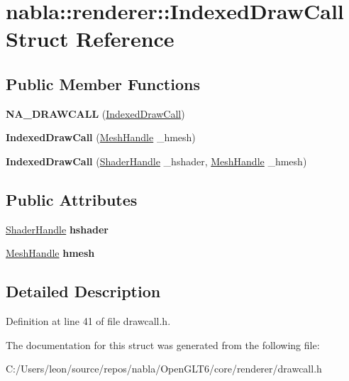 \hypertarget{structnabla_1_1renderer_1_1_indexed_draw_call}{}\section{nabla\+::renderer\+::Indexed\+Draw\+Call Struct Reference}
\label{structnabla_1_1renderer_1_1_indexed_draw_call}
\subsection*{Public Member Functions}
\begin{DoxyCompactItemize}
\item 
\mbox{\label{structnabla_1_1renderer_1_1_indexed_draw_call_ade4d7a08636b7d2f149462ad15a9c431}} 
{\bfseries N\+A\+\_\+\+D\+R\+A\+W\+C\+A\+LL} (\mbox{\hyperlink{structnabla_1_1renderer_1_1_indexed_draw_call}{Indexed\+Draw\+Call}})
\item 
\mbox{\label{structnabla_1_1renderer_1_1_indexed_draw_call_a0341b6c14a88717421dfa1f720618705}} 
{\bfseries Indexed\+Draw\+Call} (\mbox{\hyperlink{classnabla_1_1renderer_1_1_handle}{Mesh\+Handle}} \+\_\+hmesh)
\item 
\mbox{\label{structnabla_1_1renderer_1_1_indexed_draw_call_af9299df4bc3cac5cba953a8a7a20f912}} 
{\bfseries Indexed\+Draw\+Call} (\mbox{\hyperlink{classnabla_1_1renderer_1_1_handle}{Shader\+Handle}} \+\_\+hshader, \mbox{\hyperlink{classnabla_1_1renderer_1_1_handle}{Mesh\+Handle}} \+\_\+hmesh)
\end{DoxyCompactItemize}
\subsection*{Public Attributes}
\begin{DoxyCompactItemize}
\item 
\mbox{\label{structnabla_1_1renderer_1_1_indexed_draw_call_a00b8b3a0417db6570b26859b0d38f9f5}} 
\mbox{\hyperlink{classnabla_1_1renderer_1_1_handle}{Shader\+Handle}} {\bfseries hshader}
\item 
\mbox{\label{structnabla_1_1renderer_1_1_indexed_draw_call_a56cb957fcde4e5c9498d2729f9af7280}} 
\mbox{\hyperlink{classnabla_1_1renderer_1_1_handle}{Mesh\+Handle}} {\bfseries hmesh}
\end{DoxyCompactItemize}


\subsection{Detailed Description}


Definition at line 41 of file drawcall.\+h.



The documentation for this struct was generated from the following file\+:\begin{DoxyCompactItemize}
\item 
C\+:/\+Users/leon/source/repos/nabla/\+Open\+G\+L\+T6/core/renderer/drawcall.\+h\end{DoxyCompactItemize}
